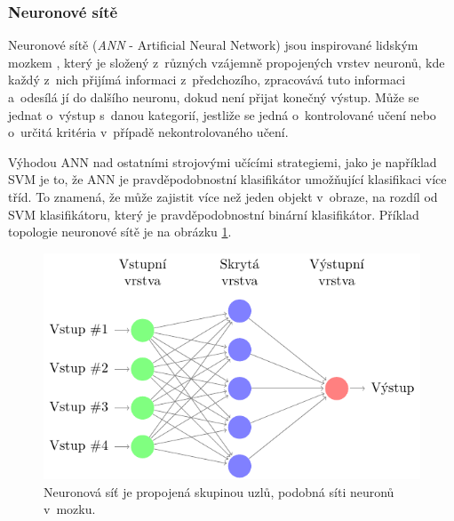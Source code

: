 \subsubsection*{Neuronové sítě}
Neuronové sítě (\textit{ANN} - Artificial Neural Network) jsou inspirované lidským mozkem \cite{ann}, který je složený z~různých vzájemně propojených vrstev neuronů, kde každý z~nich přijímá informaci z~předchozího, zpracovává tuto informaci a~odesílá jí do dalšího neuronu, dokud není přijat konečný výstup. Může se jednat o~výstup s~danou kategorií, jestliže se jedná o~kontrolované učení nebo o~určitá kritéria v~případě nekontrolovaného učení.

Výhodou ANN nad ostatními strojovými učícími strategiemi, jako je například SVM je to, že ANN je pravděpodobnostní klasifikátor umožňující klasifikaci více tříd. To znamená, že může zajistit více než jeden objekt v~obraze, na rozdíl od SVM klasifikátoru, který je pravděpodobnostní binární klasifikátor. Příklad topologie neuronové sítě je na obrázku \ref{fig:ann}. 
\begin{figure}[H]
\centering
\includegraphics[width=.87\linewidth]{figures/ann.pdf}
\caption{Neuronová síť je propojená skupinou uzlů, podobná síti neuronů v~mozku.}
\label{fig:ann}
\end{figure}

